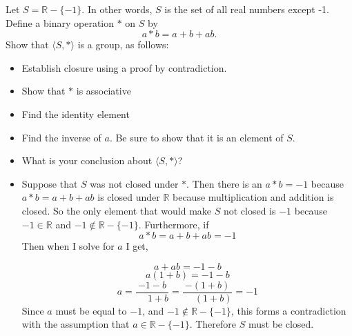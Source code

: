 \documentclass[titlepage]{article}
\newenvironment{problem}[2][Problem]{\begin{trivlist}
\item[\hskip \labelsep {\bfseries #1}\hskip \labelsep {\bfseries #2.}]}{\end{trivlist}}
\begin{document}
\begin{problem}{7}
	Let $S = \mathbb{R} - \{-1\}.$ In other words, $S$ is the set of all real numbers except -1. Define a binary operation $*$ on $S$ by
	$$ a*b = a+b+ab.$$
	Show that $\langle S, * \rangle$ is a group, as follows:
	\begin{itemize}
		\item[(a)] Establish closure using a proof by contradiction.
		\item[(b)] Show that $*$ is associative
		\item[(c)] Find the identity element
		\item[(d)] Find the inverse of $a$. Be sure to show that it is an element of $S$.
		\item[(e)] What is your conclusion about $\langle S,*\rangle$?
	\end{itemize}
	\hrulefill
	\begin{itemize}
		\item[(a)] Suppose that $S$ was not closed under $*$. Then there is an $a*b = -1$ because $a*b = a+b+ab$ is closed under $\mathbb{R}$ because multiplication and addition is closed. So the only element that would make $S$ not closed is $-1$ because $-1 \in \mathbb{R}$ and $-1 \notin \mathbb{R} - \{-1\}$. Furthermore, if 
			$$a*b = a + b + ab = -1$$
			Then when I solve for $a$ I get,
		
			$$	a+ab = -1-b $$ $$ a(1+b) = -1-b $$ $$ a = \frac{-1-b}{\phantom{-}1+b} =\frac{-(1+b)}{\phantom{-}(1+b)} =-1 $$
			Since $a$ must be equal to $-1$, and $-1 \notin \mathbb{R}-\{-1\}$, this forms a contradiction with the assumption that $a\in \mathbb{R}-\{-1\}$. Therefore $S$ must be closed.
		

\end{itemize}
\end{problem}
\end{document}
